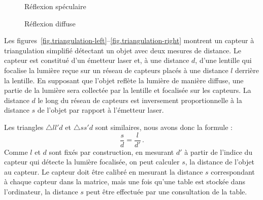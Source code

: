 \begin{figure}
\begin{minipage}{.45\textwidth}
\caption{Réflexion spéculaire\label{fig.reflect-left}}
\end{minipage}
\hspace{\fill}
\begin{minipage}{.45\textwidth}
\caption{Réflexion diffuse\label{fig.reflect-right}}
\end{minipage}
\end{figure}

Les figures~\ref{fig.triangulation-left}--\ref{fig.triangulation-right} montrent un capteur à triangulation simplifié détectant un objet avec deux mesures de distance. Le capteur est constitué d'un émetteur laser et, à une distance $d$, d'une lentille qui focalise la lumière reçue sur un réseau de capteurs placés à une distance $l$ derrière la lentille. En supposant que l'objet reflète la lumière de manière diffuse, une partie de la lumière sera collectée par la lentille et focalisée sur les capteurs. La distance $d$ le long du réseau de capteurs est inversement proportionnelle à la distance $s$ de l'objet par rapport à l'émetteur laser.

Les triangles $\triangle ll'd$ et $\triangle ss'd$ sont similaires, nous avons donc la formule :
\[
\frac{s}{d} = \frac{l}{d'}\,.
\]
Comme $l$ et $d$ sont fixés par construction, en mesurant $d'$ à partir de l'indice du capteur qui détecte la lumière focalisée, on peut calculer $s$, la distance de l'objet au capteur. Le capteur doit être calibré en mesurant la distance $s$ correspondant à chaque capteur dans la matrice, mais une fois qu'une table est stockée dans l'ordinateur, la distance $s$ peut être effectuée par une consultation de la table.

